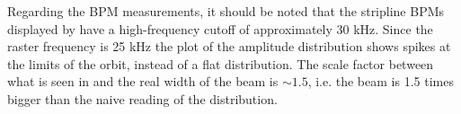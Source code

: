 Regarding the BPM measurements, it should be noted that 
the stripline BPMs displayed by  have a high-frequency 
cutoff of approximately 30 kHz.  Since the raster frequency is 25 kHz
the plot of the amplitude distribution shows spikes at the 
limits of the orbit, instead of a flat distribution.  The scale
factor between what is seen in  and the real width of the beam
is $\sim 1.5$, i.e. the beam is 1.5 times bigger than the naive
reading of the  distribution.


